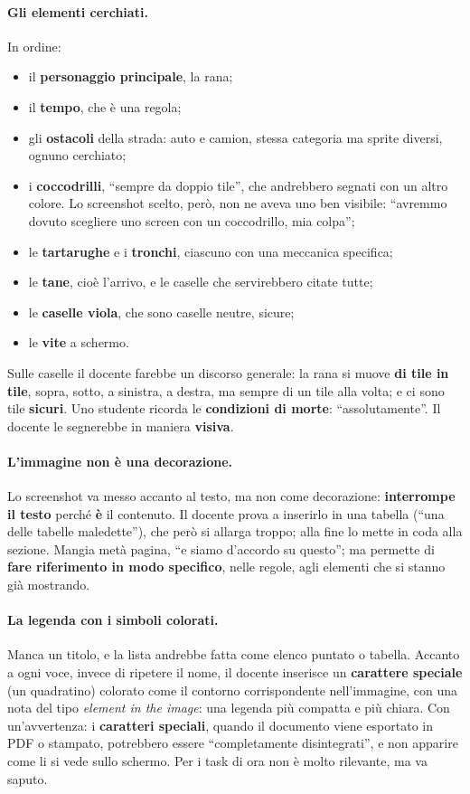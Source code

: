\paragraph{Gli elementi cerchiati.} In ordine:
\begin{itemize}
  \item il \textbf{personaggio principale}, la rana;
  \item il \textbf{tempo}, che è una regola;
  \item gli \textbf{ostacoli} della strada: auto e camion, stessa categoria
        ma sprite diversi, ognuno cerchiato;
  \item i \textbf{coccodrilli}, ``sempre da doppio tile'', che andrebbero
        segnati con un altro colore. Lo screenshot scelto, però, non ne
        aveva uno ben visibile: ``avremmo dovuto scegliere uno screen con un
        coccodrillo, mia colpa'';
  \item le \textbf{tartarughe} e i \textbf{tronchi}, ciascuno con una
        meccanica specifica;
  \item le \textbf{tane}, cioè l'arrivo, e le caselle che servirebbero
        citate tutte;
  \item le \textbf{caselle viola}, che sono caselle neutre, sicure;
  \item le \textbf{vite} a schermo.
\end{itemize}
Sulle caselle il docente farebbe un discorso generale: la rana si muove
\textbf{di tile in tile}, sopra, sotto, a sinistra, a destra, ma sempre di un
tile alla volta; e ci sono tile \textbf{sicuri}. Uno studente ricorda le
\textbf{condizioni di morte}: ``assolutamente''. Il docente le segnerebbe in
maniera \textbf{visiva}.

\paragraph{L'immagine non è una decorazione.} Lo screenshot va messo accanto
al testo, ma non come decorazione: \textbf{interrompe il testo} perché
\textbf{è} il contenuto. Il docente prova a inserirlo in una tabella (``una
delle tabelle maledette''), che però si allarga troppo; alla fine lo mette in
coda alla sezione. Mangia metà pagina, ``e siamo d'accordo su questo''; ma
permette di \textbf{fare riferimento in modo specifico}, nelle regole, agli
elementi che si stanno già mostrando.

\paragraph{La legenda con i simboli colorati.} Manca un titolo, e la lista
andrebbe fatta come elenco puntato o tabella. Accanto a ogni voce, invece di
ripetere il nome, il docente inserisce un \textbf{carattere speciale} (un
quadratino) colorato come il contorno corrispondente nell'immagine, con una
nota del tipo \emph{element in the image}: una legenda più compatta e più
chiara. Con un'avvertenza: i \textbf{caratteri speciali}, quando il documento
viene esportato in PDF o stampato, potrebbero essere ``completamente
disintegrati'', e non apparire come li si vede sullo schermo. Per i task di
ora non è molto rilevante, ma va saputo.


